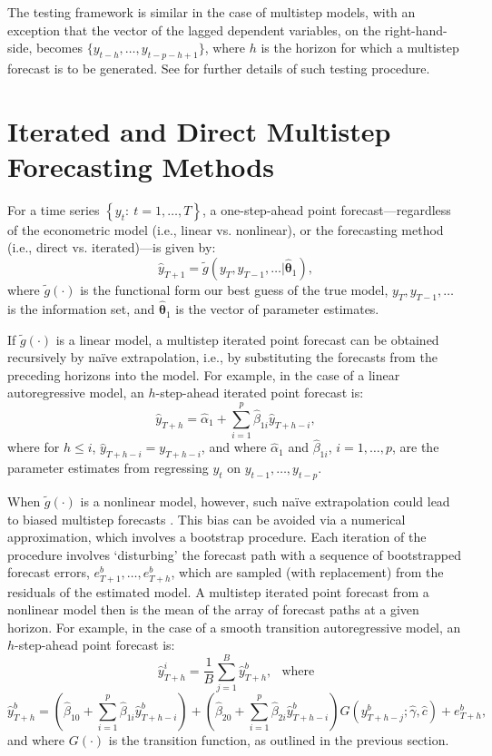 \documentclass[11pt]{article}
\begin{document}
The testing framework is similar in the case of multistep models, with an exception that the vector of the lagged dependent variables, on the right-hand-side, becomes $\{y_{t-h},\ldots,y_{t-p-h+1}\}$, where $h$ is the horizon for which a multistep forecast is to be generated. See \cite{enders2015} for further details of such testing procedure.


\section{Iterated and Direct Multistep Forecasting Methods}

For a time series $\left\{y_t\!:~t=1,\ldots,T\right\}$, a one-step-ahead point forecast---regardless of the econometric model (i.e., linear vs. nonlinear), or the forecasting method (i.e., direct vs. iterated)---is given by: $$\hat{y}_{T+1} = \tilde{g}\left(y_T,y_{T-1},\ldots | \hat{\mathbf{\theta}}_1\right),$$ where $\tilde{g}\left(\cdot\right)$ is the functional form our best guess of the true model, $y_T,y_{T-1},\ldots$ is the information set, and $\hat{\mathbf{\theta}}_1$ is the vector of parameter estimates.

If $\tilde{g}\left(\cdot\right)$ is a linear model, a multistep iterated point forecast can be obtained recursively by na\"{i}ve extrapolation, i.e., by substituting the forecasts from the preceding horizons into the model. For example, in the case of a linear autoregressive model, an $h$-step-ahead iterated point forecast is:
\begin{equation}
\label{iteratedar}
\hat{y}_{T+h} = \hat{\alpha}_{1}+\sum_{i=1}^{p}\hat{\beta}_{1i}\hat{y}_{T+h-i},
\end{equation}
where for $h \le i$, $\hat{y}_{T+h-i} = y_{T+h-i}$, and where $\hat{\alpha}_{1}$ and $\hat{\beta}_{1i}$, $i=1,\ldots,p$, are the parameter estimates from regressing $y_t$ on $y_{t-1},\ldots,y_{t-p}$.

When $\tilde{g}\left(\cdot\right)$ is a nonlinear model, however, such na\"{i}ve extrapolation could lead to biased multistep forecasts \citep[e.g.,][]{terasvirta2006}. This bias can be avoided via a numerical approximation, which involves a bootstrap procedure. Each iteration of the procedure involves `disturbing' the forecast path with a sequence of bootstrapped forecast errors, $e_{T+1}^b,\ldots,e_{T+h}^b$, which are sampled (with replacement) from the residuals of the estimated model. A multistep iterated point forecast from a nonlinear model then is the mean of the array of forecast paths at a given horizon. For example, in the case of a smooth transition autoregressive model, an $h$-step-ahead point forecast is: 
$$\hat{y}_{T+h}^i = \frac{1}{B}\sum_{j=1}^{B}\hat{y}_{T+h}^b,\;~~\text{where}$$ 
\begin{equation}
\label{iteratedstar}
\hat{y}_{T+h}^b = \left(\hat{\beta}_{10}+\sum_{i=1}^{p}\hat{\beta}_{1i}\hat{y}_{T+h-i}^b\right)+ \left(\hat{\beta}_{20}+\sum_{i=1}^{p}\hat{\beta}_{2i}\hat{y}_{T+h-i}^b\right)G\left(y_{T+h-j}^b;\hat{\gamma},\hat{c}\right)+e_{T+h}^b,
\end{equation}
and where $G\left(\cdot\right)$ is the transition function, as outlined in the previous section. 
\end{document}
